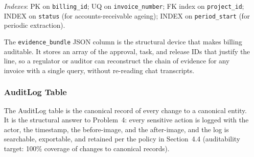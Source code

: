 \documentclass[12pt,a4paper]{report}
\begin{document}
\noindent \emph{Indexes}: PK on \texttt{billing\_id}; UQ on
\texttt{invoice\_number}; FK index on \texttt{project\_id}; INDEX on
\texttt{status} (for accounts-receivable ageing); INDEX on
\texttt{period\_start} (for periodic extraction).

The \texttt{evidence\_bundle} JSON column is the structural device that makes
billing auditable. It stores an array of the approval, task, and release IDs
that justify the line, so a regulator or auditor can reconstruct the chain of
evidence for any invoice with a single query, without re-reading chat
transcripts.

\subsubsection{AuditLog Table}
\label{tab:auditlog}

The AuditLog table is the canonical record of every change to a canonical
entity. It is the structural answer to Problem~4: every sensitive action is
logged with the actor, the timestamp, the before-image, and the after-image,
and the log is searchable, exportable, and retained per the policy in
Section~4.4 (auditability target: 100\% coverage of changes to canonical
records).
\end{document}

